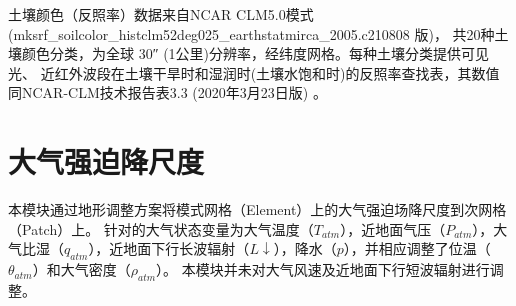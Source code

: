 土壤颜色（反照率）数据来自NCAR CLM5.0模式(mksrf\_soilcolor\-\_histclm52deg025\-\_earthstatmirca\-\_2005.c210808 版)，
共20种土壤颜色分类，为全球 \ang{;;30} (1公里)分辨率，经纬度网格。每种土壤分类提供可见光、
近红外波段在土壤干旱时和湿润时(土壤水饱和时)的反照率查找表，其数值同NCAR-CLM技术报告表3.3 (2020年3月23日版) \citep{lawrence2018}。



\section{大气强迫降尺度}\label{大气强迫降尺度}

本模块通过地形调整方案将模式网格（Element）上的大气强迫场降尺度到次网格（Patch）上。
针对的大气状态变量为大气温度（$T_{atm}$），近地面气压（$P_{atm}$），大气比湿（$q_{atm}$），近地面下行长波辐射（$L↓$），降水（$p$），并相应调整了位温（$\theta_{atm}$）和大气密度（$\rho_{atm}$）。
本模块并未对大气风速及近地面下行短波辐射进行调整。
